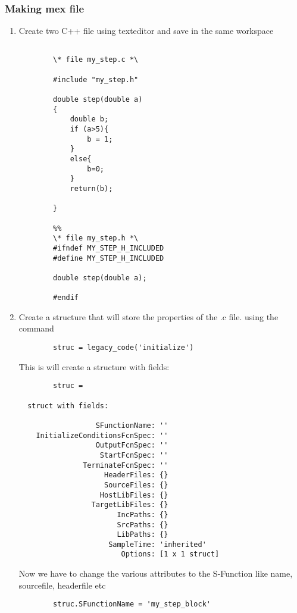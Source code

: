 \documentclass{article}
\begin{document}
\subsubsection{ Making mex file }
\begin{enumerate}
    \item Create two C++ file using texteditor and save in the same workspace
    \begin{verbatim}
    
        \* file my_step.c *\
    
        #include "my_step.h"
    
        double step(double a)
        {
            double b;
            if (a>5){
                b = 1;
            }
            else{
                b=0;
            }
            return(b);
    
        }

        %%
        \* file my_step.h *\
        #ifndef MY_STEP_H_INCLUDED
        #define MY_STEP_H_INCLUDED
        
        double step(double a);
        
        #endif
    \end{verbatim}
    
    \item Create a structure that will store the properties of the .c file. using the command
    \begin{verbatim}
        struc = legacy_code('initialize')
    \end{verbatim}
    This is will create a structure with fields:
    \begin{verbatim}
        struc = 

  struct with fields:

                  SFunctionName: ''
    InitializeConditionsFcnSpec: ''
                  OutputFcnSpec: ''
                   StartFcnSpec: ''
               TerminateFcnSpec: ''
                    HeaderFiles: {}
                    SourceFiles: {}
                   HostLibFiles: {}
                 TargetLibFiles: {}
                       IncPaths: {}
                       SrcPaths: {}
                       LibPaths: {}
                     SampleTime: 'inherited'
                        Options: [1 x 1 struct]
    \end{verbatim}
     Now we have to change the various attributes to the S-Function like name, sourcefile, headerfile etc
    \begin{verbatim}
        struc.SFunctionName = 'my_step_block'
        

\end{verbatim}
\end{enumerate}
\end{document}
